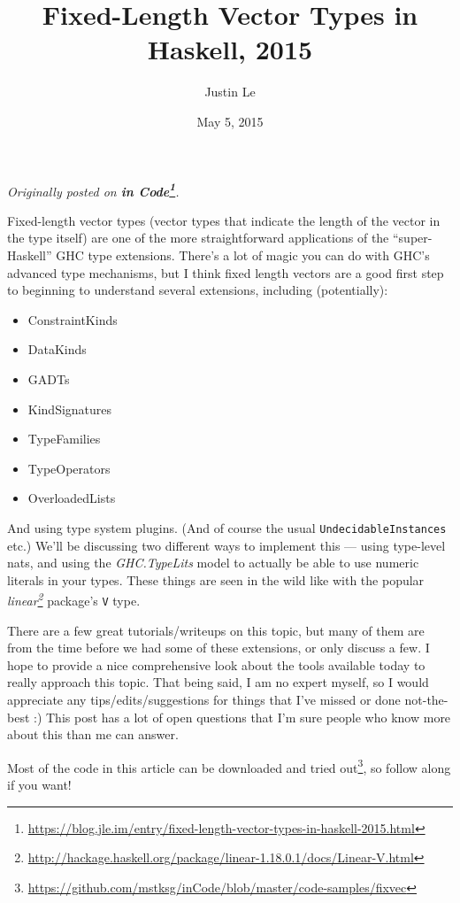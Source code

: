\documentclass[]{article}
\title{Fixed-Length Vector Types in Haskell, 2015}
\author{Justin Le}
\date{May 5, 2015}
\renewcommand{\href}[2]{#2\footnote{\url{#1}}}
\begin{document}
\maketitle

\emph{Originally posted on
\textbf{\href{https://blog.jle.im/entry/fixed-length-vector-types-in-haskell-2015.html}{in
Code}}.}

Fixed-length vector types (vector types that indicate the length of the vector
in the type itself) are one of the more straightforward applications of the
``super-Haskell'' GHC type extensions. There's a lot of magic you can do with
GHC's advanced type mechanisms, but I think fixed length vectors are a good
first step to beginning to understand several extensions, including
(potentially):

\begin{itemize}
\tightlist
\item
  ConstraintKinds
\item
  DataKinds
\item
  GADTs
\item
  KindSignatures
\item
  TypeFamilies
\item
  TypeOperators
\item
  OverloadedLists
\end{itemize}

And using type system plugins. (And of course the usual
\texttt{UndecidableInstances} etc.) We'll be discussing two different ways to
implement this --- using type-level nats, and using the \emph{GHC.TypeLits}
model to actually be able to use numeric literals in your types. These things
are seen in the wild like with the popular
\emph{\href{http://hackage.haskell.org/package/linear-1.18.0.1/docs/Linear-V.html}{linear}}
package's \texttt{V} type.

There are a few great tutorials/writeups on this topic, but many of them are
from the time before we had some of these extensions, or only discuss a few. I
hope to provide a nice comprehensive look about the tools available today to
really approach this topic. That being said, I am no expert myself, so I would
appreciate any tips/edits/suggestions for things that I've missed or done
not-the-best :) This post has a lot of open questions that I'm sure people who
know more about this than me can answer.

Most of the code in this article can be
\href{https://github.com/mstksg/inCode/blob/master/code-samples/fixvec}{downloaded
and tried out}, so follow along if you want!
\end{document}
